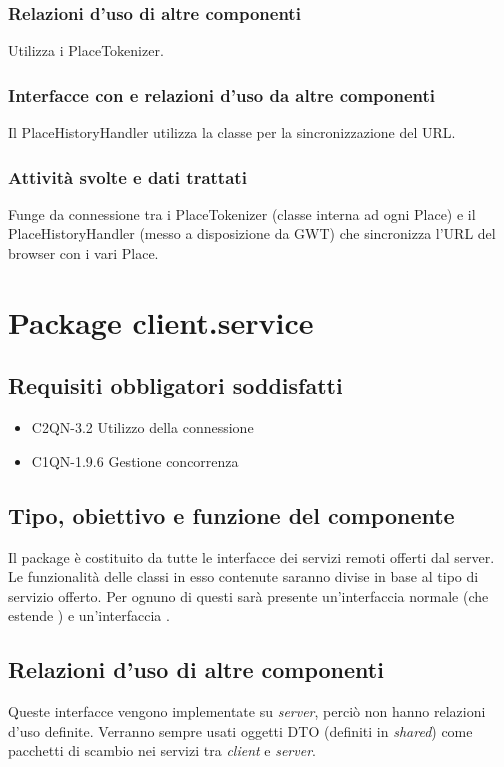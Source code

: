 \subsubsection*{Relazioni d'uso di altre componenti}
Utilizza i PlaceTokenizer.
\subsubsection*{Interfacce con e relazioni d'uso da altre componenti}
Il PlaceHistoryHandler utilizza la classe per la sincronizzazione del URL.
\subsubsection*{Attivit\`a svolte e dati trattati}
Funge da connessione tra i PlaceTokenizer (classe interna ad ogni Place) e il
PlaceHistoryHandler (messo a disposizione da GWT) che sincronizza l'URL del
browser con i vari Place.

\newpage
\section{Package client.service} %
\subsection*{Requisiti obbligatori soddisfatti}
\begin{itemize}
	\item C2QN-3.2 Utilizzo della connessione
	\item C1QN-1.9.6 Gestione concorrenza
\end{itemize}
\subsection*{Tipo, obiettivo e funzione del componente}
Il package  \`e costituito da tutte le interfacce dei servizi remoti
offerti dal server. Le funzionalit\`a delle classi in esso contenute saranno
divise in base al tipo di servizio offerto. Per ognuno di questi sar\`a
presente un'interfaccia normale (che estende ) e
un'interfaccia .

\subsection*{Relazioni d'uso di altre componenti}
Queste interfacce vengono implementate su \emph{server}, perci\`o non
hanno relazioni d'uso definite. Verranno sempre usati oggetti DTO (definiti in
\emph{shared}) come pacchetti di scambio nei servizi tra \emph{client} e
\emph{server}.

